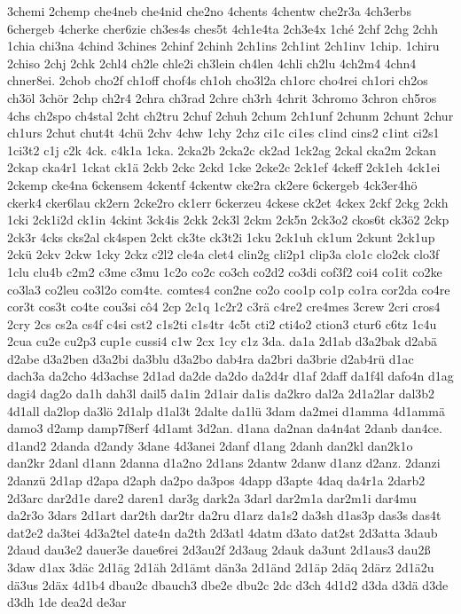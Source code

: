 {3chemi
2chemp
che4neb
che4nid
che2no
4chents
4chentw
che2r3a
4ch3erbs
6chergeb
4cherke
cher6zie
ch3es4s
ches5t
4ch1e4ta
2ch3e4x
1ché
2chf
2chg
2chh
1chia
chi3na
4chind
3chines
2chinf
2chinh
2ch1ins
2ch1int
2ch1inv
1chip.
1chiru
2chiso
2chj
2chk
2chl4
ch2le
chle2i
ch3lein
ch4len
4chli
ch2lu
4ch2m4
4chn4
chner8ei.
2chob
cho2f
ch1off
chof4s
ch1oh
cho3l2a
ch1orc
cho4rei
ch1ori
ch2os
ch3öl
3chör
2chp
ch2r4
2chra
ch3rad
2chre
ch3rh
4chrit
3chromo
3chron
ch5ros
4chs
ch2spo
ch4stal
2cht
ch2tru
2chuf
2chuh
2chum
2ch1unf
2chunm
2chunt
2chur
ch1urs
2chut
chut4t
4chü
2chv
4chw
1chy
2chz
ci1c
ci1es
c1ind
cins2
c1int
ci2s1
1ci3t2
c1j
c2k
4ck.
c4k1a
1cka.
2cka2b
2cka2c
ck2ad
1ck2ag
2ckal
cka2m
2ckan
2ckap
cka4r1
1ckat
ck1ä
2ckb
2ckc
2ckd
1cke
2cke2c
2ck1ef
4ckeff
2ck1eh
4ck1ei
2ckemp
cke4na
6ckensem
4ckentf
4ckentw
cke2ra
ck2ere
6ckergeb
4ck3er4hö
ckerk4
cker6lau
ck2ern
2cke2ro
ck1err
6ckerzeu
4ckese
ck2et
4ckex
2ckf
2ckg
2ckh
1cki
2ck1i2d
ck1in
4ckint
3ck4is
2ckk
2ck3l
2ckm
2ck5n
2ck3o2
ckos6t
ck3ö2
2ckp
2ck3r
4cks
cks2al
ck4spen
2ckt
ck3te
ck3t2i
1cku
2ck1uh
ck1um
2ckunt
2ck1up
2ckü
2ckv
2ckw
1cky
2ckz
c2l2
cle4a
clet4
clin2g
cli2p1
clip3a
clo1c
clo2ck
clo3f
1clu
clu4b
c2m2
c3me
c3mu
1c2o
co2c
co3ch
co2d2
co3di
cof3f2
coi4
co1it
co2ke
co3la3
co2leu
co3l2o
com4te.
comtes4
con2ne
co2o
coo1p
co1p
co1ra
cor2da
co4re
cor3t
cos3t
co4te
cou3si
cô4
2cp
2c1q
1c2r2
c3rä
c4re2
cre4mes
3crew
2cri
cros4
2cry
2cs
cs2a
cs4f
c4si
cst2
c1s2ti
c1s4tr
4c5t
cti2
cti4o2
ction3
ctur6
c6tz
1c4u
2cua
cu2e
cu2p3
cup1e
cussi4
c1w
2cx
1cy
c1z
3da.
da1a
2d1ab
d3a2bak
d2abä
d2abe
d3a2ben
d3a2bi
da3blu
d3a2bo
dab4ra
da2bri
da3brie
d2ab4rü
d1ac
dach3a
da2cho
4d3achse
2d1ad
da2de
da2do
da2d4r
d1af
2daff
da1f4l
dafo4n
d1ag
dagi4
dag2o
da1h
dah3l
dail5
da1in
2d1air
da1is
da2kro
dal2a
2d1a2lar
dal3b2
4d1all
da2lop
da3lö
2d1alp
d1al3t
2dalte
da1lü
3dam
da2mei
d1amma
4d1ammä
damo3
d2amp
damp7f8erf
4d1amt
3d2an.
d1ana
da2nan
da4n4at
2danb
dan4ce.
d1and2
2danda
d2andy
3dane
4d3anei
2danf
d1ang
2danh
dan2kl
dan2k1o
dan2kr
2danl
d1ann
2danna
d1a2no
2d1ans
2dantw
2danw
d1anz
d2anz.
2danzi
2danzü
2d1ap
d2apa
d2aph
da2po
da3pos
4dapp
d3apte
4daq
da4r1a
2darb2
2d3arc
dar2d1e
dare2
daren1
dar3g
dark2a
3darl
dar2m1a
dar2m1i
dar4mu
da2r3o
3dars
2d1art
dar2th
dar2tr
da2ru
d1arz
da1s2
da3sh
d1as3p
das3s
das4t
dat2e2
da3tei
4d3a2tel
date4n
da2th
2d3atl
4datm
d3ato
dat2st
2d3atta
3daub
2daud
dau3e2
dauer3e
daue6rei
2d3au2f
2d3aug
2dauk
da3unt
2d1aus3
dau2ß
3daw
d1ax
3däc
2d1äg
2d1äh
2d1ämt
dän3a
2d1änd
2d1äp
2däq
2därz
2d1ä2u
dä3us
2däx
4d1b4
dbau2c
dbauch3
dbe2e
dbu2c
2dc
d3ch
4d1d2
d3da
d3dä
d3de
d3dh
1de
dea2d
de3ar
}
